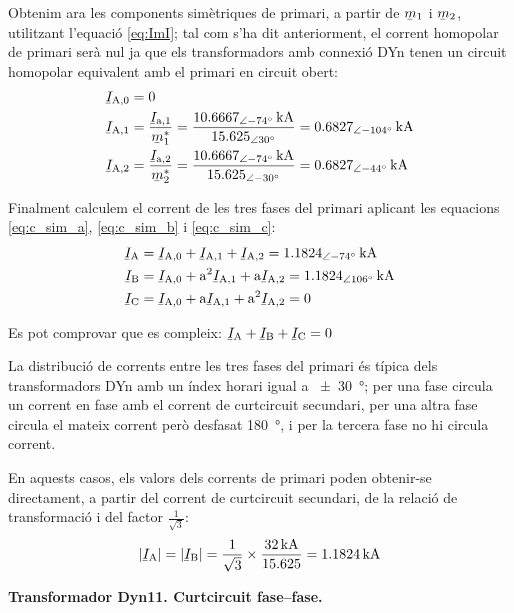 \begin{exemple}
    Obtenim ara les components simètriques de primari, a partir de $\cmplx{m}_1$ i $\cmplx{m}_2$, utilitzant l'equació \eqref{eq:ImI}; tal com s'ha dit anteriorment, el corrent homopolar de primari serà nul ja que els transformadors amb connexió DYn tenen un circuit homopolar equivalent amb el primari en circuit obert:
    \begin{align*}
        \cmplx{I}\ped{A,0} &= 0 \\
        \cmplx{I}\ped{A,1} &= \frac{\cmplx{I}\ped{a,1}}{\cmplx{m}^*_1} = \frac{\SIpd{10,6667}{-74}{kA}}{\numpd{15,625}{30}} =  \SIpd{0,6827}{-104}{kA} \\
        \cmplx{I}\ped{A,2} &= \frac{\cmplx{I}\ped{a,2}}{\cmplx{m}^*_2} = \frac{\SIpd{10,6667}{-74}{kA}}{\numpd{15,625}{-30}} = \SIpd{0,6827}{-44}{kA}
    \end{align*}

    Finalment calculem el corrent de les tres fases del primari aplicant les equacions \eqref{eq:c_sim_a}, \eqref{eq:c_sim_b} i \eqref{eq:c_sim_c}:
     \begin{align*}
        \cmplx{I}\ped{A} &= \cmplx{I}\ped{A,0} + \cmplx{I}\ped{A,1} + \cmplx{I}\ped{A,2} = \SIpd{1,1824}{-74}{kA} \\
        \cmplx{I}\ped{B} &= \cmplx{I}\ped{A,0} + \au^2 \cmplx{I}\ped{A,1} + \au \cmplx{I}\ped{A,2} = \SIpd{1,1824}{106}{kA} \\
        \cmplx{I}\ped{C} &= \cmplx{I}\ped{A,0} + \au \cmplx{I}\ped{A,1} + \au^2 \cmplx{I}\ped{A,2} = 0
    \end{align*}

    Es pot comprovar que es compleix: $\cmplx{I}\ped{A} + \cmplx{I}\ped{B} + \cmplx{I}\ped{C} = 0$

    La distribució de corrents entre les tres fases del primari és típica dels transformadors DYn amb un índex horari igual a \SI{+-30}{\degree}; per una fase circula un corrent en fase amb el corrent de curtcircuit secundari, per una altra fase circula el mateix corrent però desfasat \SI{180}{\degree}, i per la tercera fase no hi circula corrent.

    En aquests casos, els valors dels corrents de primari poden obtenir-se directament, a partir del corrent de curtcircuit secundari, de la relació de transformació i del factor $\frac{1}{\sqrt{3}}$:
    \[
        |\cmplx{I}\ped{A}| = |\cmplx{I}\ped{B}| = \frac{1}{\sqrt{3}} \times \frac{\SI{32}{kA}}{\num{15,625}} = \SI{1,1824}{kA}
    \]

    \textbf{ Transformador Dyn11. Curtcircuit fase--fase.}


\end{exemple}
